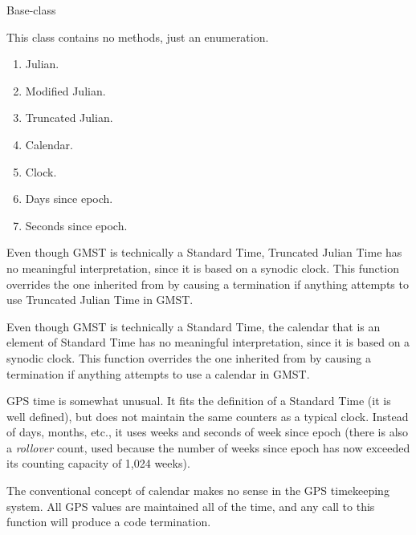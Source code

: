 {\begin{enumerate}
{\begin{enumerate}
\end{enumerate}}


 Base-class

This class contains no methods, just an enumeration.

\begin{enumerate}
\item Julian.
\item Modified Julian.
\item Truncated Julian.
\item Calendar.
\item Clock.
\item Days since epoch.
\item Seconds since epoch.
\end{enumerate}




{\begin{enumerate}
Even though GMST is technically a Standard Time, Truncated Julian Time
has no meaningful interpretation, since it is based on a synodic clock.
 This function overrides the one inherited from 
by causing a termination if anything attempts to use Truncated Julian
Time in GMST.

Even though GMST is technically a Standard Time, the calendar that is an
element of Standard Time  has no meaningful interpretation, since it is
based on a synodic clock.  This function overrides the one inherited
from  by causing a termination if anything
attempts to use a calendar in GMST.

\end{enumerate}}





GPS time is somewhat unusual.  It fits the definition of a Standard Time
(it is well defined), but does not maintain the same counters as a
typical clock.  Instead of days, months, etc., it uses weeks and
seconds of week since epoch (there is also a \textit{rollover} count,
used because the number of weeks since epoch has now exceeded its
counting capacity of 1,024 weeks).

{\begin{enumerate}
The conventional concept of calendar makes no sense in the GPS
timekeeping system.  All GPS values are maintained all of the time, and
any call to this function will produce a code termination.


\end{enumerate}}
\end{enumerate}}

